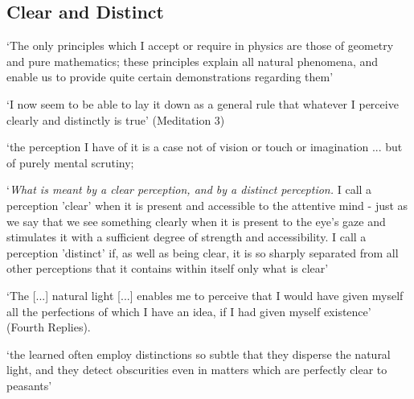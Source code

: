 \documentclass[12pt]{extarticle}
\begin{document}
\begin{multicols*}{3}
 
\section{Clear and Distinct}

‘The only principles which I accept or require in physics are those of geometry and pure mathematics; 
these principles explain all natural phenomena, and enable us to provide quite certain demonstrations 
regarding them’
\citep[p.~247, AT 2:64]{descartes:1985_csm1}
 
‘I now seem to be able to lay it down as a general rule that
whatever I perceive clearly and distinctly is true’
(Meditation 3)
 
‘the perception I have of it is a case not of 
vision or touch or imagination 
... but of 
purely mental scrutiny;
 
‘\emph{What is meant by a clear perception, and by a distinct perception.}
I
call a perception 'clear' when it is present and accessible to the
attentive mind - just as we say that we see something clearly when it is
present to the eye's gaze and stimulates it with a sufficient degree of
strength and accessibility.
I call a perception 'distinct' if, as well as
being clear, it is so sharply separated from all other perceptions that it contains
within itself only what is clear’
\citep[pp.~207--8, AT VIII:21--22]{descartes:1985_csm1}
 
‘The [...] natural light [...] enables me to perceive that I would have given myself all the perfections of which I have an idea, if I had given myself existence’
(Fourth Replies).
 
‘the learned
often employ distinctions so subtle that they disperse the natural light,
and they detect obscurities even in matters which are perfectly clear to
peasants’
\citep[p.~59]{descartes:1985_csm1}
 

    









\footnotesize


\end{multicols*}
\end{document}
